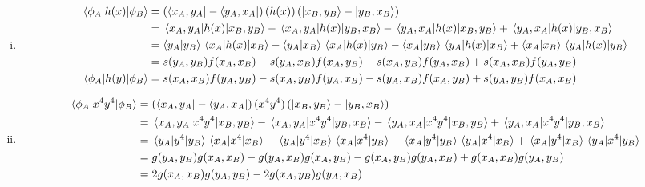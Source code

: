 \documentclass{article}
\begin{document}
\begin{enumerate}[i)]
  \item 
    \begin{align*}
      \matrixel{\phi_A}{h(x)}{\phi_B} &= \left( \bra{x_A,y_A}-\bra{y_A,x_A}\right)(h(x))\left( \ket{x_B,y_B} - \ket{y_B,x_B}\right) \\
      &= \matrixel{x_A,y_A}{h(x)}{x_B,y_B} - \matrixel{x_A,y_A}{h(x)}{y_B,x_B} - \matrixel{y_A,x_A}{h(x)}{x_B,y_B} + \matrixel{y_A,x_A}{h(x)}{y_B,x_B} \\
      &= \bra{y_A}\ket{y_B}\matrixel{x_A}{h(x)}{x_B} - \bra{y_A}\ket{x_B}\matrixel{x_A}{h(x)}{y_B} - \bra{x_A}\ket{y_B}\matrixel{y_A}{h(x)}{x_B} + \bra{x_A}\ket{x_B}\matrixel{y_A}{h(x)}{y_B} \\
      &= s(y_A,y_B)f(x_A,x_B) - s(y_A,x_B)f(x_A,y_B) - s(x_A,y_B)f(y_A,x_B) + s(x_A,x_B)f(y_A,y_B)\\
      \matrixel{\phi_A}{h(y)}{\phi_B} &= s(x_A,x_B)f(y_A,y_B) - s(x_A,y_B)f(y_A,x_B) - s(y_A,x_B)f(x_A,y_B) + s(y_A,y_B)f(x_A,x_B)\\
    \end{align*}

  \item 
    \begin{align*}
      \matrixel{\phi_A}{x^4y^4}{\phi_B} &= \left( \bra{x_A,y_A}-\bra{y_A,x_A}\right)(x^4y^4)\left( \ket{x_B,y_B} - \ket{y_B,x_B}\right) \\
      &= \matrixel{x_A,y_A}{x^4y^4}{x_B,y_B} - \matrixel{x_A,y_A}{x^4y^4}{y_B,x_B} - \matrixel{y_A,x_A}{x^4y^4}{x_B,y_B} + \matrixel{y_A,x_A}{x^4y^4}{y_B,x_B} \\
      &= \matrixel{y_A}{y^4}{y_B}\matrixel{x_A}{x^4}{x_B} - \matrixel{y_A}{y^4}{x_B}\matrixel{x_A}{x^4}{y_B} - \matrixel{x_A}{y^4}{y_B}\matrixel{y_A}{x^4}{x_B} + \matrixel{x_A}{y^4}{x_B}\matrixel{y_A}{x^4}{y_B} \\
      &= g(y_A,y_B)g(x_A,x_B) - g(y_A,x_B)g(x_A,y_B) - g(x_A,y_B)g(y_A,x_B) + g(x_A,x_B)g(y_A,y_B)\\
      &= 2g(x_A,x_B)g(y_A,y_B) - 2g(x_A,y_B)g(y_A,x_B)
    \end{align*}


\end{enumerate}
\end{document}
